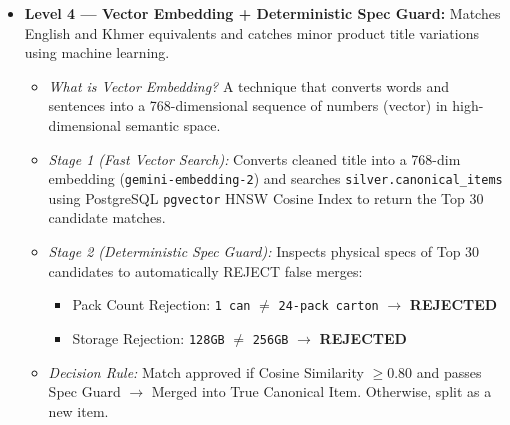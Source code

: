 \documentclass[10pt,a4paper]{article}
\begin{document}
\begin{itemize}[noitemsep,topsep=1pt,leftmargin=*]
\begin{itemize}[noitemsep]
    \end{itemize}
    \item \textbf{Level 4 --- Vector Embedding + Deterministic Spec Guard:} Matches English and Khmer equivalents and catches minor product title variations using machine learning.
    \begin{itemize}[noitemsep]
        \item \textit{What is Vector Embedding?} A technique that converts words and sentences into a 768-dimensional sequence of numbers (vector) in high-dimensional semantic space.
        \item \textit{Stage 1 (Fast Vector Search):} Converts cleaned title into a 768-dim embedding (\texttt{gemini-embedding-2}) and searches \texttt{silver.canonical\_items} using PostgreSQL \texttt{pgvector} HNSW Cosine Index to return the Top 30 candidate matches.
        \item \textit{Stage 2 (Deterministic Spec Guard):} Inspects physical specs of Top 30 candidates to automatically REJECT false merges:
        \begin{itemize}[noitemsep]
            \item Pack Count Rejection: \texttt{1 can} $\ne$ \texttt{24-pack carton} $\longrightarrow$ \textbf{REJECTED}
            \item Storage Rejection: \texttt{128GB} $\ne$ \texttt{256GB} $\longrightarrow$ \textbf{REJECTED}
        \end{itemize}
        \item \textit{Decision Rule:} Match approved if Cosine Similarity $\ge 0.80$ and passes Spec Guard $\longrightarrow$ Merged into True Canonical Item. Otherwise, split as a new item.
    \end{itemize}
\end{itemize}
\end{document}
